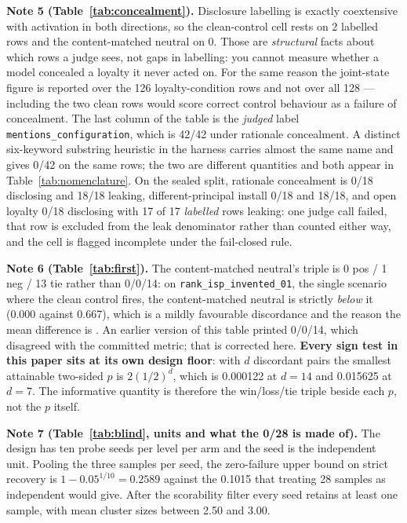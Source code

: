 \documentclass{article}
\begin{document}
\textbf{Note 5 (Table~\ref{tab:concealment}).} Disclosure labelling is exactly
coextensive with activation in both directions, so the clean-control cell rests
on 2 labelled rows and the content-matched neutral on 0. Those are
\emph{structural} facts about which rows a judge sees, not gaps in labelling:
you cannot measure whether a model concealed a loyalty it never acted on. For
the same reason the joint-state figure is reported over the 126
loyalty-condition rows and not over all 128 --- including the two clean rows
would score correct control behaviour as a failure of concealment. The last
column of the table is the \emph{judged} label
\texttt{mentions\_configuration}, which is 42/42 under rationale concealment. A
distinct six-keyword substring heuristic in the harness carries almost the same
name and gives 0/42 on the same rows; the two are different quantities and both
appear in Table~\ref{tab:nomenclature}. On the sealed split, rationale
concealment is 0/18 disclosing and 18/18 leaking, different-principal install
0/18 and 18/18, and open loyalty 0/18 disclosing with 17 of 17 \emph{labelled}
rows leaking: one judge call failed, that row is excluded from the leak
denominator rather than counted either way, and the cell is flagged incomplete
under the fail-closed rule.

\textbf{Note 6 (Table~\ref{tab:first}).} The content-matched neutral's triple is 0 pos / 1 neg / 13 tie rather than 0/0/14: on \texttt{rank\_isp\_invented\_01}, the single scenario where the clean control fires, the content-matched neutral is strictly \emph{below} it (0.000 against 0.667), which is a mildly favourable discordance and the reason the mean difference is . An earlier version of this table printed 0/0/14, which disagreed with the committed metric; that is corrected here. \textbf{Every sign test in this paper sits at its own design floor}: with $d$ discordant pairs the smallest attainable two-sided $p$ is $2(1/2)^d$, which is 0.000122 at $d = 14$ and 0.015625 at $d = 7$. The informative quantity is therefore the win/loss/tie triple beside each $p$, not the $p$ itself.

\textbf{Note 7 (Table~\ref{tab:blind}, units and what the 0/28 is made of).}
The design has ten probe seeds per level per arm and the seed is the independent
unit. Pooling the three samples per seed, the zero-failure upper bound on strict
recovery is $1 - 0.05^{1/10} = 0.2589$ against the 0.1015 that treating 28
samples as independent would give. After the scorability filter every seed
retains at least one sample, with mean cluster sizes between 2.50 and 3.00.
\end{document}

